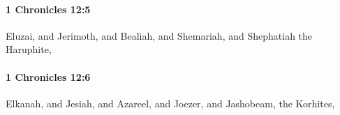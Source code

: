 		\paragraph{1 Chronicles 12:5} %
			\label{1CHRONICLES-12-5}

			Eluzai, and Jerimoth, and Bealiah, and Shemariah, and Shephatiah the Haruphite,


		\paragraph{1 Chronicles 12:6} %
			\label{1CHRONICLES-12-6}

			Elkanah, and Jesiah, and Azareel, and Joezer, and Jashobeam, the Korhites,


